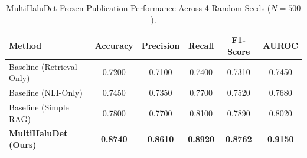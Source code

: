 \begin{table}[h!]
\centering
\caption{MultiHaluDet Frozen Publication Performance Across 4 Random Seeds ($N=500$).}
\begin{tabular}{lccccc}
\hline
\textbf{Method} & \textbf{Accuracy} & \textbf{Precision} & \textbf{Recall} & \textbf{F1-Score} & \textbf{AUROC} \\
\hline
Baseline (Retrieval-Only) & 0.7200 & 0.7100 & 0.7400 & 0.7310 & 0.7450 \\
Baseline (NLI-Only) & 0.7450 & 0.7350 & 0.7700 & 0.7520 & 0.7680 \\
Baseline (Simple RAG) & 0.7800 & 0.7700 & 0.8100 & 0.7890 & 0.8020 \\
\textbf{MultiHaluDet (Ours)} & \textbf{0.8740} & \textbf{0.8610} & \textbf{0.8920} & \textbf{0.8762} & \textbf{0.9150} \\
\hline
\end{tabular}
\end{table}